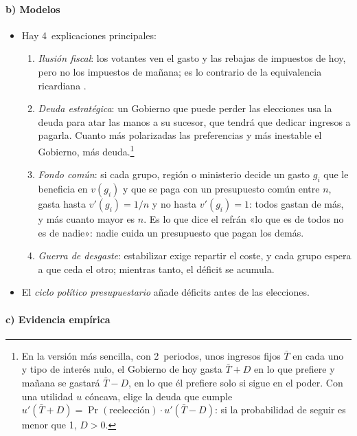 \documentclass[11pt]{article}
\begin{document}
\paragraph{b) Modelos}

\begin{itemize}
\item Hay 4~explicaciones principales:
  \begin{enumerate}
  \item \emph{Ilusión fiscal}: los votantes ven el gasto y las rebajas de impuestos de hoy, pero no los impuestos de mañana; es lo contrario de la equivalencia ricardiana\nocite{BuchananWagner1977Democracy} .
  \item \emph{Deuda estratégica}: un Gobierno que puede perder las elecciones usa la deuda para atar las manos a su sucesor, que tendrá que dedicar ingresos a pagarla\nocite{PerssonSvensson1989Why,AlesinaTabellini1990Positive}. Cuanto más polarizadas las preferencias y más inestable el Gobierno, más deuda.\footnote{En la versión más sencilla, con 2~periodos, unos ingresos fijos $\bar T$ en cada uno y tipo de interés nulo, el Gobierno de hoy gasta $\bar T+D$ en lo que prefiere y mañana se gastará $\bar T-D$, en lo que él prefiere solo si sigue en el poder. Con una utilidad $u$ cóncava, elige la deuda que cumple $u'(\bar T+D)=\Pr(\text{reelección})\cdot u'(\bar T-D)$: si la probabilidad de seguir es menor que 1, $D>0$\nocite{Romer2019Advanced}.}
  \item \emph{Fondo común}: si cada grupo, región o ministerio decide un gasto $g_i$ que le beneficia en $v(g_i)$ y que se paga con un presupuesto común entre $n$, gasta hasta $v'(g_i)=1/n$ y no hasta $v'(g_i)=1$: todos gastan de más, y más cuanto mayor es $n$\nocite{WeingastShepsleJohnsen1981Political}. Es lo que dice el refrán «lo que es de todos no es de nadie»: nadie cuida un presupuesto que pagan los demás.
  \item \emph{Guerra de desgaste}: estabilizar exige repartir el coste, y cada grupo espera a que ceda el otro; mientras tanto, el déficit se acumula\nocite{AlesinaDrazen1991Why}.
  \end{enumerate}
\item El \emph{ciclo político presupuestario} añade déficits antes de las elecciones\nocite{Nordhaus1975Political,Rogoff1990Equilibrium}.
\end{itemize}

\paragraph{c) Evidencia empírica}
\end{document}

